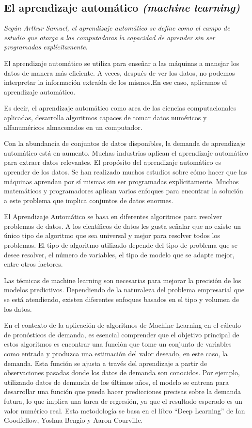 \subsection{El aprendizaje automático \textit{(machine learning)}}

\textit{Según Arthur Samuel, el aprendizaje automático se define como el campo de estudio que otorga a las computadoras la capacidad de aprender sin ser programadas explícitamente}\cite{mahesh2020machine}. 

El aprendizaje automático se utiliza para enseñar a las máquinas a manejar los datos de manera más eficiente. A veces, después de ver los datos, no podemos interpretar la información extraída de los mismos.En ese caso, aplicamos el aprendizaje automático.

Es decir, el aprendizaje automático como area de las ciencias computacionales aplicadas, desarrolla algoritmos capaces de tomar datos numéricos y alfanuméricos almacenados en un computador\cite{herrera2020prediccion}. 

Con la abundancia de conjuntos de datos disponibles, la demanda de aprendizaje automático está en aumento. Muchas industrias aplican el aprendizaje automático para extraer datos relevantes. El propósito del aprendizaje automático es aprender de los datos. Se han realizado muchos estudios sobre cómo hacer que las máquinas aprendan por sí mismas sin ser programadas explícitamente. Muchos matemáticos y programadores aplican varios enfoques para encontrar la solución a este problema que implica conjuntos de datos enormes\cite{mahesh2020machine}.

\vspace{1\baselineskip}
El Aprendizaje Automático se basa en diferentes algoritmos para resolver problemas de datos. A los científicos de datos les gusta señalar que no existe un único tipo de algoritmo que sea universal y mejor para resolver todos los problemas. El tipo de algoritmo utilizado depende del tipo de problema que se desee resolver, el número de variables, el tipo de modelo que se adapte mejor, entre otros factores. 

Las técnicas de machine learning son necesarias para mejorar la precisión de los modelos predictivos. Dependiendo de la naturaleza del problema empresarial que se está atendiendo, existen diferentes enfoques basados en el tipo y volumen de los datos\cite{ibm}.

En el contexto de la aplicación de algoritmos de Machine Learning en el cálculo de pronósticos de demanda, es esencial comprender que el objetivo principal de estos algoritmos es encontrar una función que tome un conjunto de variables como entrada y produzca una estimación del valor deseado, en este caso, la demanda. Esta función se ajusta a través del aprendizaje a partir de observaciones pasadas donde los datos de demanda son conocidos. Por ejemplo, utilizando datos de demanda de los últimos años, el modelo se entrena para desarrollar una función que pueda hacer predicciones precisas sobre la demanda futura, lo que implica una tarea de regresión, ya que el resultado esperado es un valor numérico real. Esta metodología se basa en el libro “Deep Learning” de Ian Goodfellow, Yoshua Bengio y Aaron Courville\cite{goodfellow2016deep}.

